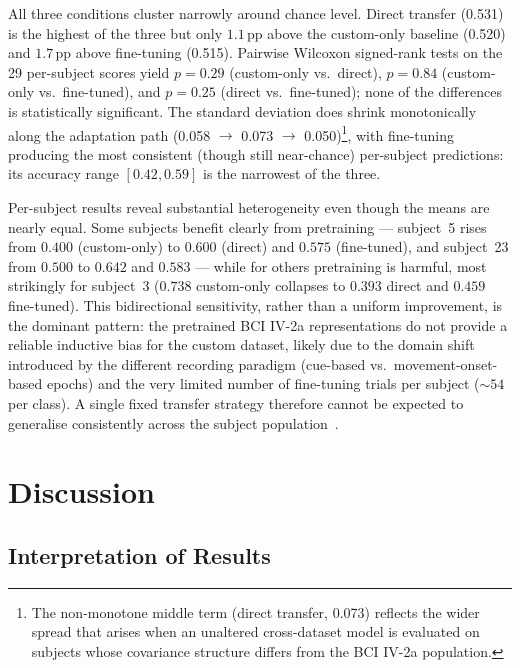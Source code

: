 \documentclass[english, bc, kiv, he, iso690alph, pdf]{fasthesis}
\begin{document}
All three conditions cluster narrowly around chance level. Direct transfer (0.531) is the highest of the three but only $1.1$\,pp above the custom-only baseline (0.520) and $1.7$\,pp above fine-tuning (0.515). Pairwise Wilcoxon signed-rank tests on the 29 per-subject scores yield $p = 0.29$ (custom-only vs.\ direct), $p = 0.84$ (custom-only vs.\ fine-tuned), and $p = 0.25$ (direct vs.\ fine-tuned); none of the differences is statistically significant. The standard deviation does shrink monotonically along the adaptation path (0.058 $\rightarrow$ 0.073 $\rightarrow$ 0.050)\footnote{The non-monotone middle term (direct transfer, 0.073) reflects the wider spread that arises when an unaltered cross-dataset model is evaluated on subjects whose covariance structure differs from the BCI IV-2a population.}, with fine-tuning producing the most consistent (though still near-chance) per-subject predictions: its accuracy range $[0.42, 0.59]$ is the narrowest of the three.

Per-subject results reveal substantial heterogeneity even though the means are nearly equal. Some subjects benefit clearly from pretraining --- subject~5 rises from $0.400$ (custom-only) to $0.600$ (direct) and $0.575$ (fine-tuned), and subject~23 from $0.500$ to $0.642$ and $0.583$ --- while for others pretraining is harmful, most strikingly for subject~3 ($0.738$ custom-only collapses to $0.393$ direct and $0.459$ fine-tuned). This bidirectional sensitivity, rather than a uniform improvement, is the dominant pattern: the pretrained BCI IV-2a representations do not provide a reliable inductive bias for the custom dataset, likely due to the domain shift introduced by the different recording paradigm (cue-based vs.\ movement-onset-based epochs) and the very limited number of fine-tuning trials per subject (${\sim}54$ per class). A single fixed transfer strategy therefore cannot be expected to generalise consistently across the subject population~\cite{lotte2018review,wu2022transfer}.

\chapter{Discussion}

\section{Interpretation of Results}
\end{document}
